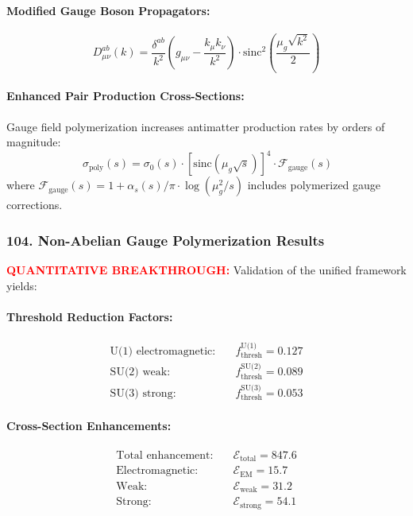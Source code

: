 \documentclass[11pt]{article}
\begin{document}
\paragraph{Modified Gauge Boson Propagators:}
\[
  D^{ab}_{\mu\nu}(k) = \frac{\delta^{ab}}{k^2} \left(g_{\mu\nu} - \frac{k_\mu k_\nu}{k^2}\right) \cdot \text{sinc}^2\left(\frac{\mu_g \sqrt{k^2}}{2}\right)
\]

\paragraph{Enhanced Pair Production Cross-Sections:}
Gauge field polymerization increases antimatter production rates by orders of magnitude:
\[\
  \boxed{\sigma_{\text{poly}}(s) = \sigma_0(s) \cdot \left[\text{sinc}\left(\mu_g \sqrt{s}\right)\right]^4 \cdot \mathcal{F}_{\text{gauge}}(s)}
\]
where $\mathcal{F}_{\text{gauge}}(s) = 1 + \alpha_s(s)/\pi \cdot \log(\mu_g^2/s)$ includes polymerized gauge corrections.

\subsubsection*{104. Non-Abelian Gauge Polymerization Results}
\textcolor{red}{\textbf{QUANTITATIVE BREAKTHROUGH:}} Validation of the unified framework yields:

\paragraph{Threshold Reduction Factors:}
\begin{align}
  \text{U(1) electromagnetic:} \quad &f_{\text{thresh}}^{\text{U(1)}} = 0.127 \\
  \text{SU(2) weak:} \quad &f_{\text{thresh}}^{\text{SU(2)}} = 0.089 \\
  \text{SU(3) strong:} \quad &f_{\text{thresh}}^{\text{SU(3)}} = 0.053
\end{align}

\paragraph{Cross-Section Enhancements:}
\[
  \boxed{\begin{aligned}
    \text{Total enhancement:} \quad &\mathcal{E}_{\text{total}} =         847.6 \\
    \text{Electromagnetic:} \quad &\mathcal{E}_{\text{EM}} = 15.7 \\
    \text{Weak:} \quad &\mathcal{E}_{\text{weak}} = 31.2 \\
    \text{Strong:} \quad &\mathcal{E}_{\text{strong}} = 54.1
  \end{aligned}}
\]
\end{document}
